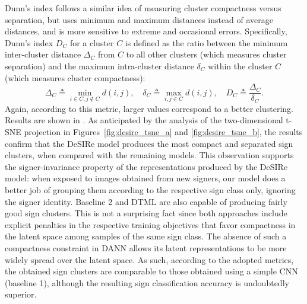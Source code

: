Dunn's index follows a similar idea of measuring cluster compactness versus separation, but uses minimum and maximum distances instead of average distances, and is more sensitive to extreme and occasional errors. Specifically, Dunn's index $D_C$ for a cluster $C$ is defined as the ratio between the minimum inter-cluster distance $\Delta_C$ from $C$ to all other clusters (which measures cluster separation) and the maximum intra-cluster distance $\delta_C$ within the cluster $C$ (which measures cluster compactness):
\begin{equation}
    \Delta_C \triangleq \min_{i \in C, j \not\in C} d(i,j), \quad \delta_C \triangleq \max_{i,j \in C} d(i,j), \quad  D_C \triangleq \frac{\Delta_C}{\delta_C}.
\end{equation}
Again, according to this metric, larger values correspond to a better clustering.
Results are shown in . As anticipated by the analysis of the two-dimensional t-SNE projection in Figures~\ref{fig:desire_tsne_a} and \ref{fig:desire_tsne_b}, the results confirm that the DeSIRe model produces the most compact and separated sign clusters, when compared with the remaining models. This observation supports the signer-invariance property of the representations produced by the DeSIRe model: when exposed to images obtained from new signers, our model does a better job of grouping them according to the respective sign class only, ignoring the signer identity. Baseline 2 and DTML are also capable of producing fairly good sign clusters. This is not a surprising fact since both approaches include explicit penalties in the respective training objectives that favor compactness in the latent space among samples of the same sign class. The absence of such a compactness constraint in DANN allows its latent representations to be more widely spread over the latent space. As such, according to the adopted metrics, the obtained sign clusters are comparable to those obtained using a simple CNN (baseline 1), although the resulting sign classification accuracy is undoubtedly superior.

